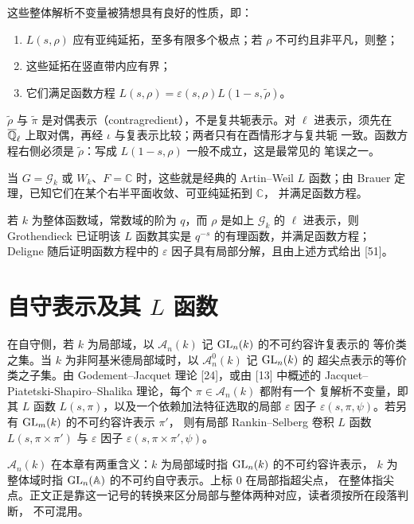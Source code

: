 这些整体解析不变量被猜想具有良好的性质，即：
\begin{enumerate}[label=(\arabic*),leftmargin=*]
  \item $L(s,\rho)$ 应有亚纯延拓，至多有限多个极点；若 $\rho$ 不可约且非平凡，则整；
  \item 这些延拓在竖直带内应有界；
  \item 它们满足函数方程
    $L(s,\rho)=\varepsilon(s,\rho)L(1-s,\tilde\rho)$。
\end{enumerate}
\begin{annote}
$\tilde\rho$ 与 $\tilde\pi$ 是对偶表示（contragredient），不是复共轭表示。对 $\ell$
进表示，须先在 $\overline{\mathbb{Q}}_\ell$ 上取对偶，再经 $\iota$ 与复表示比较；两者只有在酉情形才与复共轭
一致。函数方程右侧必须是 $\tilde\rho$：写成 $L(1-s,\rho)$ 一般不成立，这是最常见的
笔误之一。
\par\vspace{0.15em}{\raggedleft 【来源：Tate 1979, \S3--4；Cogdell, 本书第 9 章（A）】\par}
\end{annote}

当 $G=\mathcal{G}_k$ 或 $W_k$、$F=\mathbb{C}$ 时，这些就是经典的 Artin--Weil
$L$ 函数；由 Brauer 定理，已知它们在某个右半平面收敛、可亚纯延拓到 $\mathbb{C}$，
并满足函数方程。

若 $k$ 为整体函数域，常数域的阶为 $q$，而 $\rho$ 是如上 $\mathcal{G}_k$ 的 $\ell$
进表示，则 Grothendieck 已证明该 $L$ 函数其实是 $q^{-s}$ 的有理函数，并满足函数方程；
Deligne 随后证明函数方程中的 $\varepsilon$ 因子具有局部分解，且由上述方式给出 [51]。

\section{自守表示及其 \texorpdfstring{$L$}{L} 函数}

在自守侧，若 $k$ 为局部域，以 $\mathcal{A}_n(k)$ 记 $\mathrm{GL}_n(k)$ 的不可约容许复表示的
等价类之集。当 $k$ 为非阿基米德局部域时，以 $\mathcal{A}_n^0(k)$ 记 $\mathrm{GL}_n(k)$ 的
超尖点表示的等价类之子集。由 Godement--Jacquet 理论 [24]，或由 [13] 中概述的
Jacquet--Piatetski-Shapiro--Shalika 理论，每个 $\pi\in\mathcal{A}_n(k)$ 都附有一个
复解析不变量，即其 $L$ 函数 $L(s,\pi)$，以及一个依赖加法特征选取的局部 $\varepsilon$
因子 $\varepsilon(s,\pi,\psi)$。若另有 $\mathrm{GL}_m(k)$ 的不可约容许表示 $\pi'$，
则有局部 Rankin--Selberg 卷积 $L$ 函数 $L(s,\pi\times\pi')$ 与 $\varepsilon$ 因子
$\varepsilon(s,\pi\times\pi',\psi)$。
\begin{annote}
$\mathcal{A}_n(k)$ 在本章有两重含义：$k$ 为局部域时指 $\mathrm{GL}_n(k)$ 的不可约容许表示，
$k$ 为整体域时指 $\mathrm{GL}_n(\mathbb{A})$ 的不可约自守表示。上标 $0$ 在局部指超尖点，
在整体指尖点。正文正是靠这一记号的转换来区分局部与整体两种对应，读者须按所在段落判断，
不可混用。
\par\vspace{0.15em}{\raggedleft 【来源：Cogdell, 本书第 9 章《$\GL_n$ 的 $L$ 函数解析理论》\S1--2（A）】\par}
\end{annote}

